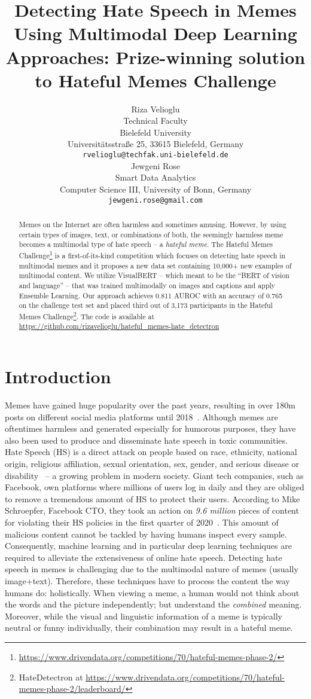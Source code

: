 \documentclass{article}
\title{Detecting Hate Speech in Memes Using Multimodal Deep Learning Approaches: Prize-winning solution to Hateful Memes Challenge}
\author{Riza Velioglu \\
  Technical Faculty\\
  Bielefeld University\\
  Universitätsstraße 25, 33615 Bielefeld, Germany \\
  \texttt{rvelioglu@techfak.uni-bielefeld.de} \\
\And
  Jewgeni Rose \\
  Smart Data Analytics \\
  Computer Science III, University of Bonn, Germany \\
  \texttt{jewgeni.rose@gmail.com} \\
}
\begin{document}
\maketitle

\begin{abstract}
  Memes on the Internet are often harmless and sometimes amusing. However, by using certain types of images, text, or combinations of both, the seemingly harmless meme becomes a multimodal type of hate speech -- a \textit{hateful meme}. The Hateful Memes Challenge\footnote{\url{https://www.drivendata.org/competitions/70/hateful-memes-phase-2/}} is a first-of-its-kind competition which focuses on detecting hate speech in multimodal memes and it proposes a new data set containing 10,000+ new examples of multimodal content. We utilize VisualBERT -- which meant to be the ``BERT of vision and language'' -- that was trained multimodally on images and captions and apply Ensemble Learning. Our approach achieves 0.811 AUROC with an accuracy of 0.765 on the challenge test set and placed third out of 3,173 participants in the Hateful Memes Challenge\footnote{HateDetectron at \url{https://www.drivendata.org/competitions/70/hateful-memes-phase-2/leaderboard/}}. The code is available at 
\url{https://github.com/rizavelioglu/hateful_memes-hate_detectron}
\end{abstract}


\section{Introduction}
\label{intro}


  Memes have gained huge popularity over the past years, resulting in over 180m posts on different social media platforms until 2018~\cite{zannettou2018origins}. Although memes are oftentimes harmless and generated especially for humorous purposes, they have also been used to produce and disseminate hate speech in toxic communities. Hate Speech (HS) is a direct attack on people based on race, ethnicity, national origin, religious affiliation, sexual orientation, sex, gender, and serious disease or disability~\cite{fb} -- a growing problem in modern society. Giant tech companies, such as Facebook, own platforms where millions of users log in daily and they are obliged to remove a tremendous amount of HS to protect their users. According to Mike Schroepfer, Facebook CTO, they took an action on \emph{9.6 million} pieces of content for violating their HS policies in the first quarter of 2020~\cite{fbCTO}. This amount of malicious content cannot be tackled by having humans inspect every sample. Consequently, machine learning and in particular deep learning techniques are required to alleviate the extensiveness of online hate speech. Detecting hate speech in memes is challenging due to the multimodal nature of memes (usually image+text). Therefore, these techniques have to process the content the way humans do: holistically. When viewing a meme, a human would not think about the words and the picture independently; but understand the \textit{combined} meaning. Moreover, while the visual and linguistic information of a meme is typically neutral or funny individually, their combination may result in a hateful meme.
  
\end{document}
